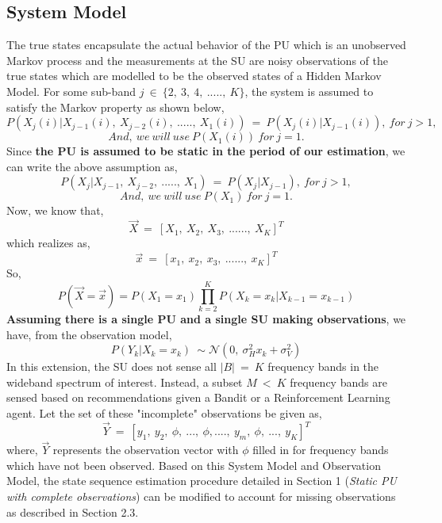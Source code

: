 \documentclass[12pt, draftcls, onecolumn]{IEEEtran}
\begin{document}
\subsection{System Model}
The true states encapsulate the actual behavior of the PU which is an unobserved Markov process and the measurements at the SU are noisy observations of the true states which are modelled to be the observed states of a Hidden Markov Model.
For some sub-band $j\ \in\ \{2,\ 3,\ 4,\ .....,\ K\}$, the system is assumed to satisfy the Markov property as shown below,
\[P(X_{j}(i)|X_{j-1}(i),\ X_{j-2}(i),\ .....,\ X_1(i))\ =\ P(X_{j}(i)|X_{j-1}(i)),\ for\ j>1,\]
\[And,\ we\ will\ use\ P(X_1(i))\ for\ j=1.\]
Since \textbf{the PU is assumed to be static in the period of our estimation}, we can write the above assumption as,
\[P(X_{j}|X_{j-1},\ X_{j-2},\ .....,\ X_1)\ =\ P(X_{j}|X_{j-1}),\ for\ j>1,\]
\[And,\ we\ will\ use\ P(X_1)\ for\ j=1.\]
Now, we know that,
\[\vec{X}\ =\ [X_1,\ X_2,\ X_3,\ ......,\ X_K]^T\] which realizes as,
\[\vec{x}\ =\ [x_1,\ x_2,\ x_3,\ ......,\ x_K]^T\]
So,
\begin{equation}\label{30}
    P(\vec{X}=\vec{x}) = P(X_1=x_1) \prod_{k=2}^{K} P(X_k=x_k|X_{k-1}=x_{k-1})
\end{equation}
\textbf{Assuming there is a single PU and a single SU making observations}, we have, from the observation model,
\begin{equation}\label{31}
    P(Y_k|X_k = x_k)\ \sim \mathcal{N}(0,\ \sigma_H^2x_k+\sigma_V^2)
\end{equation}
In this extension, the SU does not sense all $|B|\ =\ K$ frequency bands in the wideband spectrum of interest. Instead, a subset $M\ <\ K$ frequency bands are sensed based on recommendations given a Bandit or a Reinforcement Learning agent. Let the set of these "incomplete" observations be given as,
\[\vec{Y}\ =\ [y_1,\ y_2,\ \phi,\ ...,\ \phi,....,\ y_m,\ \phi,\ ...,\ y_K]^T\]
where, $\vec{Y}$ represents the observation vector with $\phi$ filled in for frequency bands which have not been observed.
Based on this System Model and Observation Model, the state sequence estimation procedure detailed in Section 1 (\textit{Static PU with complete observations}) can be modified to account for missing observations as described in Section 2.3.
\end{document}
